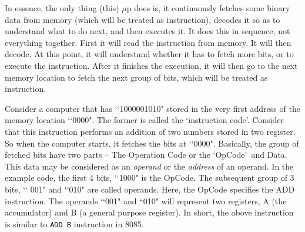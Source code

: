 \documentclass{book}
\begin{document}
In essence, the only thing (this) $\mu$p does is, it continuously fetches some
binary
data from memory (which will be treated as instruction), decodes it so as to
understand what to do next, and then executes
it. It does this in sequence, not everything together. First it will read the
instruction from memory. It will then decode. At this point, it will understand
whether it has to fetch more bits, or to execute the instruction. After it
finishes the execution,
it will then go to the next memory location to fetch the next group of bits,
which will be treated as instruction.

Consider a computer that has \lq\lq1000001010" stored in the very first address
of
the memory location \lq\lq0000". The former is called the \lq instruction code\rq.
Consider that this instruction performs an addition of two numbers stored in two
register. So when the computer starts, 
it fetches the bits at \lq\lq 0000".  Basically, the group of fetched bits have 
two parts -- The Operation Code or the \lq OpCode\rq\ and Data. This data may be
considered
as an \emph{operand} or the \emph{address} of an operand. In the example code, the
first 4 bits, \lq\lq 1000" is the OpCode. The subsequent group of 3 bits, \lq\lq
001"
and \lq\lq 010" are called operands. Here, the OpCode specifies the ADD
instruction. The operands \lq\lq001" and ``010" will represent two registers, 
A (the accumulator) and B (a general purpose register). In short, the above instruction is similar to
\texttt{ADD B} instruction in 8085. 
\end{document}
